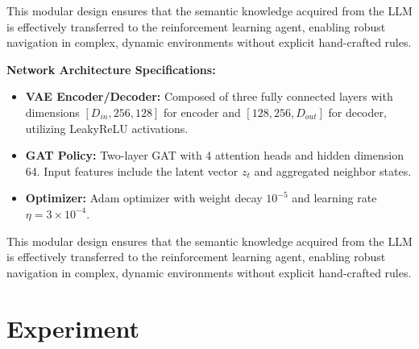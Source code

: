 \documentclass[conference]{IEEEtran}
\begin{document}
This modular design ensures that the semantic knowledge acquired from the LLM is effectively transferred to the reinforcement learning agent, enabling robust navigation in complex, dynamic environments without explicit hand-crafted rules.

\noindent\textbf{Network Architecture Specifications:}
\begin{itemize}
    \item \textbf{VAE Encoder/Decoder:} Composed of three fully connected layers with dimensions $[D_{in}, 256, 128]$ for encoder and $[128, 256, D_{out}]$ for decoder, utilizing LeakyReLU activations.
    \item \textbf{GAT Policy:} Two-layer GAT with 4 attention heads and hidden dimension 64. Input features include the latent vector $z_t$ and aggregated neighbor states.
    \item \textbf{Optimizer:} Adam optimizer with weight decay $10^{-5}$ and learning rate $\eta = 3 \times 10^{-4}$.
\end{itemize}

This modular design ensures that the semantic knowledge acquired from the LLM is effectively transferred to the reinforcement learning agent, enabling robust navigation in complex, dynamic environments without explicit hand-crafted rules.
\section{Experiment}



    
\end{document}
